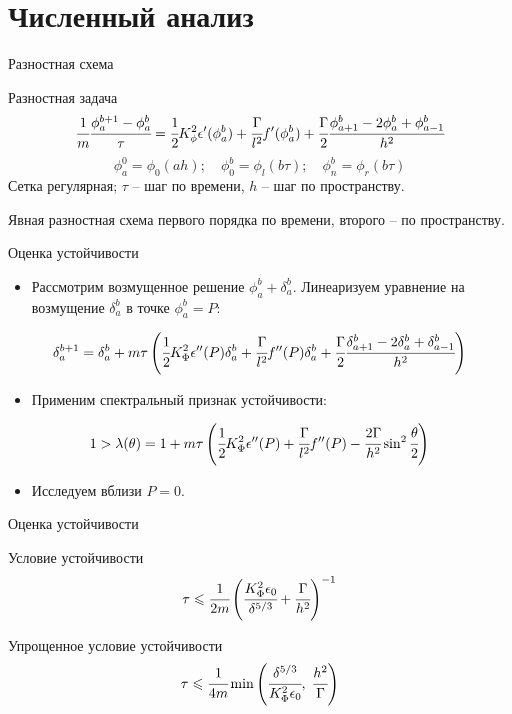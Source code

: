 \documentclass[aspectratio=169]{beamer}
\begin{document}
\section{Численный анализ}

\begin{frame}{Разностная схема}
\begin{block}{Разностная задача}
	$$\cfrac{1}{m} \cfrac{\phi_a^{b + 1} - \phi_a^b}{\tau} = \cfrac{1}{2} K_\phi^2
	\epsilon'(\phi_a^b) + \cfrac{\Gamma}{l^2} f'(\phi_a^b) + \cfrac{\Gamma}{2}
	\cfrac{\phi_{a + 1}^b - 2 \phi_a^b + \phi_{a - 1}^b}{h^2}$$
	$$\phi_a^0 = \phi_0(ah); \quad \phi_0^b = \phi_l(b \tau); \quad \phi_n^b = \phi_r(b \tau)$$
	Сетка регулярная; $\tau$ -- шаг по времени, $h$ -- шаг по пространству.
\end{block}
Явная разностная схема первого порядка по времени, второго -- по пространству.
\end{frame}


\begin{frame}{Оценка устойчивости}
\begin{itemize}
\item Рассмотрим возмущенное решение $\phi_a^b + \delta_a^b$. Линеаризуем уравнение на возмущение
$\delta_a^b$ в точке $\phi_a^b = P$:
\end{itemize}
$$\delta_a^{b + 1} = \delta_a^b + m \tau \left( \cfrac{1}{2} K_\Phi^2 \epsilon''(P) \delta_a^b +
\cfrac{\Gamma}{l^2} f''(P) \delta_a^b + \cfrac{\Gamma}{2} \cfrac{\delta_{a + 1}^b - 2 \delta_a^b +
\delta_{a - 1}^b}{h^2} \right)$$
\begin{itemize}
\item Применим спектральный признак устойчивости:
\end{itemize}
$$1 > \lambda(\theta) = 1 + m \tau \left( \cfrac{1}{2} K_\Phi^2 \epsilon''(P) +
\cfrac{\Gamma}{l^2} f''(P) - \cfrac{2 \Gamma}{h^2} \sin^2 \cfrac{\theta}{2} \right)$$
\begin{itemize}
\item Исследуем вблизи $P = 0$.
\end{itemize}
\end{frame}


\begin{frame}{Оценка устойчивости}
\begin{block}{Условие устойчивости}
	$$\tau \leqslant \cfrac{1}{2m} \left( \cfrac{K_\Phi^2 \epsilon_0}{\delta^{5/3}} +
	\cfrac{\Gamma}{h^2} \right)^{-1}$$
\end{block}
\begin{block}{Упрощенное условие устойчивости}
	$$\tau \leqslant \cfrac{1}{4m} \min \left(\cfrac{\delta^{5/3}}{K_\Phi^2 \epsilon_0}, \;
	\cfrac{h^2}{\Gamma} \right)$$
\end{block}
\end{frame}
\end{document}
